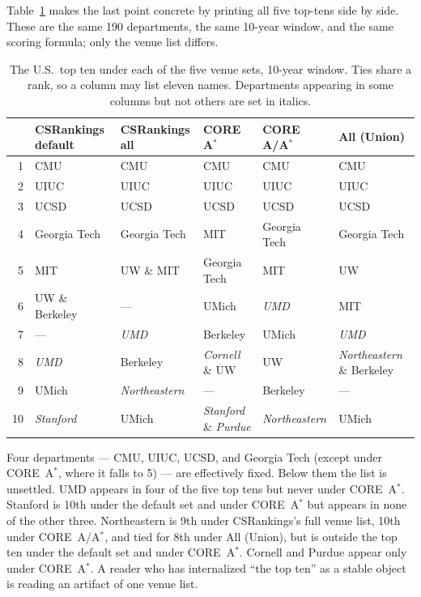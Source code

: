 \documentclass[11pt]{article}
\newcommand{\csr}{CSRankings}
\begin{document}
Table~\ref{tab:toptens} makes the last point concrete by printing all five
top-tens side by side. These are the same 190 departments, the same 10-year
window, and the same scoring formula; only the venue list differs.

\begin{table}[t]
\centering
\small
\caption{The U.S.\ top ten under each of the five venue sets, 10-year window.
Ties share a rank, so a column may list eleven names. Departments appearing in
some columns but not others are set in italics.}
\label{tab:toptens}
\setlength{\tabcolsep}{3.5pt}
\begin{tabular}{rlllll}
\toprule
& \csr{} default & \csr{} all & CORE A$^*$ & CORE A/A$^*$ & All (Union) \\
\midrule
1  & CMU  & CMU  & CMU  & CMU  & CMU \\
2  & UIUC & UIUC & UIUC & UIUC & UIUC \\
3  & UCSD & UCSD & UCSD & UCSD & UCSD \\
4  & Georgia Tech & Georgia Tech & MIT & Georgia Tech & Georgia Tech \\
5  & MIT  & UW \& MIT & Georgia Tech & MIT & UW \\
6  & UW \& Berkeley & --- & UMich & \emph{UMD} & MIT \\
7  & --- & \emph{UMD} & Berkeley & UMich & \emph{UMD} \\
8  & \emph{UMD} & Berkeley & \emph{Cornell} \& UW & UW & \emph{Northeastern} \& Berkeley \\
9  & UMich & \emph{Northeastern} & --- & Berkeley & --- \\
10 & \emph{Stanford} & UMich & \emph{Stanford} \& \emph{Purdue} & \emph{Northeastern} & UMich \\
\bottomrule
\end{tabular}
\end{table}

Four departments --- CMU, UIUC, UCSD, and Georgia Tech (except under CORE~A$^*$,
where it falls to 5) --- are effectively fixed. Below them the list is
unsettled. UMD appears in four of the five top tens but never under CORE~A$^*$.
Stanford is 10th under the default set and under CORE~A$^*$ but appears in
none of the other three. Northeastern is 9th under \csr{}'s full venue list,
10th under CORE~A/A$^*$, and tied for 8th under All (Union), but is outside
the top ten under the default set and under CORE~A$^*$. Cornell and Purdue
appear only under CORE~A$^*$. A reader who has internalized ``the top ten'' as a stable
object is reading an artifact of one venue list.
\end{document}
